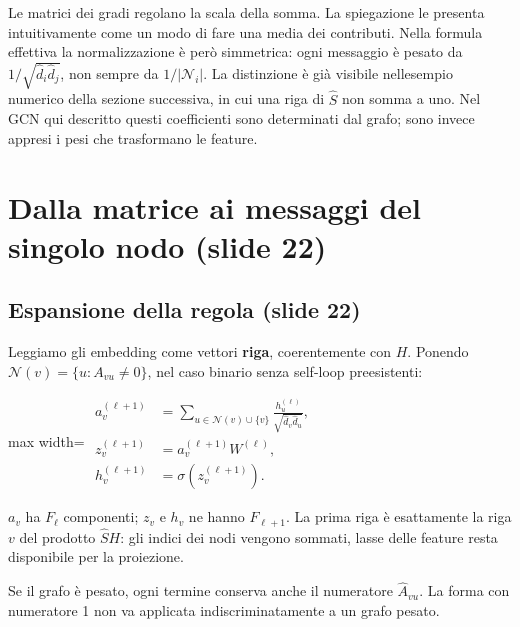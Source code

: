 \documentclass[11pt,a4paper,oneside,openany]{book}
\begin{document}
Le matrici dei gradi regolano la scala della somma. La spiegazione le presenta intuitivamente come un modo di fare una media dei contributi. Nella formula effettiva la normalizzazione è però simmetrica: ogni messaggio è pesato da \(1/\sqrt{\widehat d_i\widehat d_j}\), non sempre da \(1/|\mathcal N_i|\). La distinzione è già visibile nell\textquotesingle esempio numerico della sezione successiva, in cui una riga di \(\widehat S\) non somma a uno. Nel GCN qui descritto questi coefficienti sono determinati dal grafo; sono invece appresi i pesi che trasformano le feature.

\section{Dalla matrice ai messaggi del singolo nodo (slide 22)}\label{f05-r198}

\subsection{Espansione della regola (slide 22)}\label{f05-r200}

Leggiamo gli embedding come vettori \textbf{riga}, coerentemente con \(H\). Ponendo \(\mathcal N(v)=\{u:A_{vu}\ne0\}\), nel caso binario senza self-loop preesistenti:

\begin{center}
\begin{adjustbox}{max width=\linewidth}
$\displaystyle \begin{aligned}
a_v^{(\ell+1)}&=\sum_{u\in\mathcal N(v)\cup\{v\}}
\frac{h_u^{(\ell)}}{\sqrt{\widehat d_v\widehat d_u}},\\
z_v^{(\ell+1)}&=a_v^{(\ell+1)}W^{(\ell)},\\
h_v^{(\ell+1)}&=\sigma\left(z_v^{(\ell+1)}\right).
\end{aligned}$
\end{adjustbox}
\end{center}

\(a_v\) ha \(F_\ell\) componenti; \(z_v\) e \(h_v\) ne hanno \(F_{\ell+1}\). La prima riga è esattamente la riga \(v\) del prodotto \(\widehat SH\): gli indici dei nodi vengono sommati, l\textquotesingle asse delle feature resta disponibile per la proiezione.

Se il grafo è pesato, ogni termine conserva anche il numeratore \(\widehat A_{vu}\). La forma con numeratore 1 non va applicata indiscriminatamente a un grafo pesato.
\end{document}

